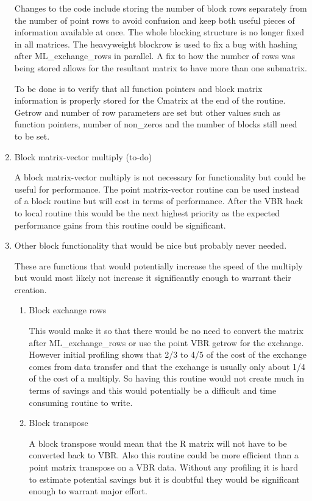 \documentclass[10pt,letter,relax]{SANDreport}
\begin{document}
\begin{enumerate}
Changes to the code include storing the number of block rows separately from the number of point rows to avoid confusion and keep both useful pieces of information available at once.
The whole blocking structure is no longer fixed in all matrices.  The heavyweight blockrow is used to fix a bug with hashing after ML\_exchange\_rows in parallel.
A fix to how the number of rows was being stored allows for the resultant matrix to have more than one submatrix.

To be done is to verify that all function pointers and block matrix information is properly stored for the Cmatrix at the end of the routine.
Getrow and number of row parameters are set but other values such as function pointers, number of non\_zeros and the number of blocks still need to be set.

  \item  Block matrix-vector multiply (to-do)

  A block matrix-vector multiply is not necessary for functionality but could be useful for performance.
The point matrix-vector routine can be used instead of a block routine but will cost in terms of performance.
After the VBR back to local routine this would be the next highest priority as the expected performance gains from this routine could be significant.

\item Other block functionality that would be nice but probably never needed.

These are functions that would potentially increase the speed of the multiply but would most likely not increase it significantly enough to warrant their creation.

\begin{enumerate}

\item Block exchange rows

This would make it so that there would be no need to convert the matrix after ML\_exchange\_rows or use the point VBR getrow for the exchange.  However initial profiling shows that 2/3 to 4/5 of the cost of the exchange comes from data transfer and that the exchange is usually only about 1/4 of the cost of a multiply.  So having this routine would not create much in terms of savings and this would potentially be a difficult and time consuming routine to write.

\item Block transpose

A block transpose would mean that the R matrix will not have to be converted back to VBR.  Also this routine could be more efficient than a point matrix transpose on a VBR data.  Without any profiling it is hard to estimate potential savings but it is doubtful they would be significant enough to warrant major effort.


\end{enumerate}
\end{enumerate}
\end{document}
